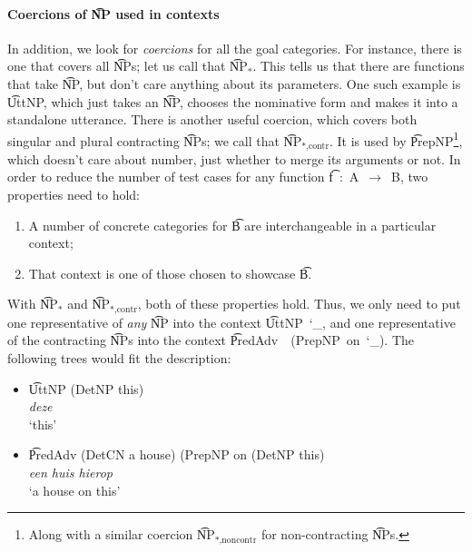 \paragraph{Coercions of \t{NP} used in contexts} In addition, we look
for \emph{coercions} for all the goal categories. For instance, there
is one that covers all \t{NP}s; let us call that \t{NP$_*$}. This
tells us that there are functions that take \t{NP}, but don’t care
anything about its parameters. One such example is \t{UttNP},
which just takes an \t{NP}, chooses the nominative form and makes it
into a standalone utterance.  There is another useful coercion, which
covers both singular and plural contracting \t{NP}s; we call that
\t{NP$_{*\text{,contr}}$}. It is used by \t{PrepNP}\footnote{Along
  with a similar coercion \t{NP$_{*\text{,noncontr}}$} for
  non-contracting \t{NP}s.}, which doesn't care about number, just
whether to merge its arguments or not.  In order to reduce the number
of test cases for any function \t{f~:~A~$\rightarrow$~B}, two
properties need to hold:
\begin{enumerate}
\item A number of concrete categories for \t{B} are interchangeable in a particular
context;
\item That context is one of those chosen to showcase \t{B}.
\end{enumerate}

\noindent With \t{NP$_*$} and \t{NP$_\text{*,contr}$}, both of these
properties hold.
Thus, we only need to put one representative of \emph{any} \t{NP} into
the context \t{UttNP~\char`_}, and one representative of the
contracting \t{NP}s into the context \t{PredAdv~~(PrepNP~on~\char`_)}.
The following trees would fit the description:

\begin{itemize}
\item[] \t{UttNP (DetNP this)}  \\
 \emph{deze} \\
 `this'
\item[] \t{PredAdv (DetCN a house) (PrepNP on (DetNP this)}  \\
\emph{een huis hierop} \\
`a house on this'
\end{itemize}



